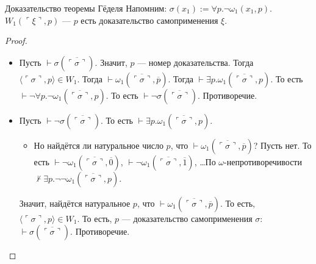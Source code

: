 \documentclass[aspectratio=169]{beamer}
\begin{document}
\begin{frame}{Доказательство теоремы Гёделя}
Напомним: $\sigma(x_1) := \forall p.\neg\omega_1(x_1,p)$. $W_1(\ulcorner\xi\urcorner,p)$ --- $p$ есть доказательство самоприменения $\xi$.
\begin{proof}
\begin{itemize}
\item Пусть $\vdash\sigma(\overline{\ulcorner\sigma\urcorner})$. Значит, $p$ --- номер доказательства. \pause Тогда
$\langle\ulcorner\sigma\urcorner,p\rangle \in W_1$. \pause Тогда $\vdash\omega_1(\overline{\ulcorner\sigma\urcorner},\overline{p})$. \pause 
Тогда $\vdash\exists p.\omega_1(\overline{\ulcorner\sigma\urcorner},p)$. \pause То есть
$\vdash\neg\forall p.\neg\omega_1(\overline{\ulcorner\sigma\urcorner},p)$. \pause То есть $\vdash\neg\sigma(\overline{\ulcorner\sigma\urcorner})$. Противоречие.
\pause
\item Пусть $\vdash\neg\sigma(\overline{\ulcorner\sigma\urcorner})$. \pause То есть $\vdash\exists p.\omega_1(\overline{\ulcorner\sigma\urcorner},p)$.
\begin{itemize}
\item
\pause Но найдётся ли натуральное число $p$, что $\vdash\omega_1(\overline{\ulcorner\sigma\urcorner},\overline{p})$?
\pause Пусть нет. То есть $\vdash\neg\omega_1(\overline{\ulcorner\sigma\urcorner},\overline{0})$,
                          $\vdash\neg\omega_1(\overline{\ulcorner\sigma\urcorner},\overline{1})$, 
                          \dots \pause По $\omega$-непротиворечивости $\not\vdash\exists p.\neg\neg\omega_1(\overline{\ulcorner\sigma\urcorner},p)$. \pause
\end{itemize}
       Значит, найдётся натуральное $p$, что $\vdash\omega_1(\overline{\ulcorner\sigma\urcorner},\overline{p})$. \pause 
То есть, $\langle\ulcorner\sigma\urcorner, p\rangle\in W_1$. \pause
То есть, $p$ --- доказательство самоприменения $\sigma$: $\vdash\sigma(\overline{\ulcorner\sigma\urcorner})$. \pause Противоречие.
\end{itemize}
\end{proof}
\end{frame}
\end{document}
